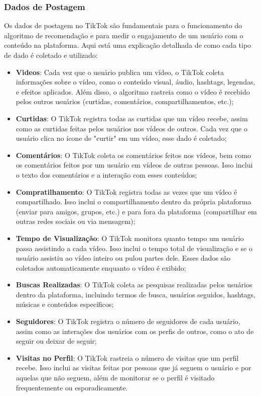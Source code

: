 \subsubsection{Dados de Postagem}

Os dados de postagem no TikTok são fundamentais para o funcionamento do algoritmo de recomendação e para medir o engajamento de um usuário com o conteúdo na plataforma. Aqui está uma explicação detalhada de como cada tipo de dado é coletado e utilizado:

\begin{itemize}
    \item \textbf{Videos}: Cada vez que o usuário publica um vídeo, o TikTok coleta informações sobre o vídeo, como o conteúdo visual, áudio, hashtags, legendas, e efeitos aplicados. Além disso, o algoritmo rastreia como o vídeo é recebido pelos outros usuários (curtidas, comentários, compartilhamentos, etc.);
    \item \textbf{Curtidas}: O TikTok registra todas as curtidas que um vídeo recebe, assim como as curtidas feitas pelos usuários nos vídeos de outros. Cada vez que o usuário clica no ícone de "curtir" em um vídeo, esse dado é coletado;
    \item \textbf{Comentários}: O TikTok coleta os comentários feitos nos vídeos, bem como os comentários feitos por um usuário em vídeos de outras pessoas. Isso inclui o texto dos comentários e a interação com esses conteúdos;
    \item \textbf{Compratilhamento}: O TikTok registra todas as vezes que um vídeo é compartilhado. Isso inclui o compartilhamento dentro da própria plataforma (enviar para amigos, grupos, etc.) e para fora da plataforma (compartilhar em outras redes sociais ou via mensagem);
    \item \textbf{Tempo de Visualização}: O TikTok monitora quanto tempo um usuário passa assistindo a cada vídeo. Isso inclui o tempo total de visualização e se o usuário assistiu ao vídeo inteiro ou pulou partes dele. Esses dados são coletados automaticamente enquanto o vídeo é exibido;
    \item  \textbf{Buscas Realizadas}: O TikTok coleta as pesquisas realizadas pelos usuários dentro da plataforma, incluindo termos de busca, usuários seguidos, hashtags, músicas e conteúdos específicos;
    \item \textbf{Seguidores}: O TikTok registra o número de seguidores de cada usuário, assim como as interações dos usuários com os perfis de outros, como o ato de seguir ou deixar de seguir;
    \item  \textbf{Visitas no Perfil}: O TikTok rastreia o número de visitas que um perfil recebe. Isso inclui as visitas feitas por pessoas que já seguem o usuário e por aquelas que não seguem, além de monitorar se o perfil é visitado frequentemente ou esporadicamente.
\end{itemize}


